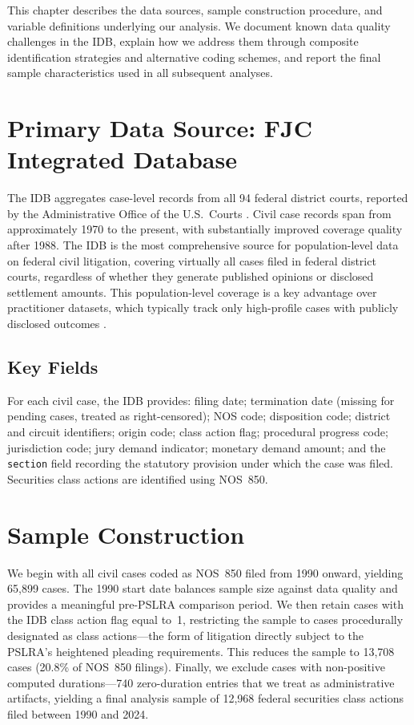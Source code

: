 
This chapter describes the data sources, sample construction
procedure, and variable definitions underlying our analysis.
We document known data quality challenges in the IDB, explain how we address
them through composite identification strategies and
alternative coding schemes, and report the final sample
characteristics used in all subsequent analyses.

\section{Primary Data Source: FJC Integrated Database}

The IDB aggregates case-level records from all 94 federal district
courts, reported by the Administrative Office of the
U.S.\ Courts \citep{fjc_idb_portal, fjc_idb_guide}. Civil
case records span from approximately 1970 to the present,
with substantially improved coverage quality after 1988.
The IDB is the most comprehensive source for population-level
data on federal civil litigation, covering virtually all cases
filed in federal district courts, regardless of whether they
generate published opinions or disclosed settlement amounts.
This population-level coverage is a key advantage over
practitioner datasets, which typically track only high-profile
cases with publicly disclosed outcomes \citep{cornerstone2024}.

\subsection{Key Fields}

For each civil case, the IDB provides: filing date;
termination date (missing for pending cases, treated as
right-censored); NOS code; disposition code;
district and circuit identifiers; origin code; class action
flag; procedural progress code; jurisdiction code; jury demand
indicator; monetary demand amount; and the \texttt{section}
field recording the statutory provision under which the case
was filed. Securities class actions are identified using NOS~850.

\section{Sample Construction}

We begin with all civil cases coded as NOS~850 filed from 1990 onward, yielding 65,899 cases. The 1990 start date balances sample size against data quality and provides a meaningful pre-PSLRA comparison period. We then retain cases with the IDB class action flag equal to~1, restricting the sample to cases procedurally designated as class actions---the form of litigation directly subject to the PSLRA's heightened pleading requirements. This reduces the sample to 13,708 cases (20.8\% of NOS~850 filings). Finally, we exclude cases with non-positive computed durations---740 zero-duration entries that we treat as administrative artifacts, yielding a final analysis sample of 12,968 federal securities class actions filed between 1990 and 2024.

